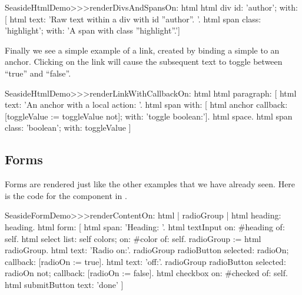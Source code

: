 \documentclass[a4paper,10pt,twoside]{book}
\begin{document}
\begin{code}{}
SeasideHtmlDemo>>>renderDivsAndSpansOn: html 
	html div
		id: 'author';
		with: [
			html text: 'Raw text within a div with id ''author''. '.
			html span
				class: 'highlight';
				with: 'A span with class ''highlight''.']
\end{code}

Finally we see a simple example of a link, created by binding a simple  to an anchor. 
Clicking on the link will cause the subsequent text to toggle between ``true'' and ``false''.

\begin{code}{}
SeasideHtmlDemo>>>renderLinkWithCallbackOn: html 
	html paragraph: [
		html text: 'An anchor with a local action: '.
		html span with: [
			html anchor
				callback: [toggleValue := toggleValue not];
				with: 'toggle boolean:'].
		html space.
		html span
			class: 'boolean';
			with: toggleValue ]
\end{code}



\subsection{Forms}

Forms are rendered just like the other examples that we have already seen.
Here is the code for the  component in .

\begin{code}{}
SeasideFormDemo>>>renderContentOn: html
	| radioGroup |
	html heading: heading.
	html form: [
		html span: 'Heading: '.
		html textInput on: #heading of: self.
		html select
			list: self colors;
			on: #color of: self.
		radioGroup := html radioGroup.
		html text: 'Radio on:'.
		radioGroup radioButton
			selected: radioOn;
			callback: [radioOn := true].
		html text: 'off:'.
		radioGroup radioButton
			selected: radioOn not;
			callback: [radioOn := false].
		html checkbox on: #checked of: self.
		html submitButton
			text: 'done' ]
\end{code}{}
\end{document}
